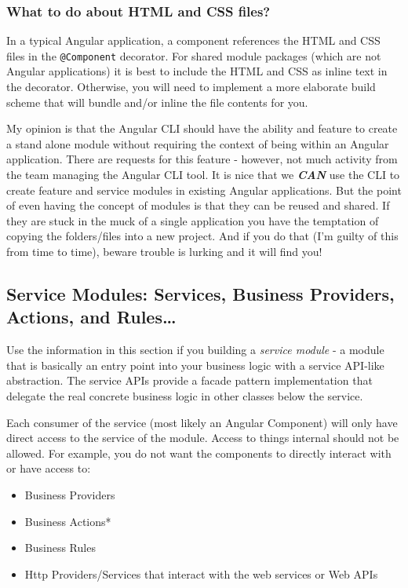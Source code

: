 \documentclass[]{book}
\providecommand{\tightlist}{%
  \setlength{\itemsep}{0pt}\setlength{\parskip}{0pt}}
\theoremstyle{definition}
\theoremstyle{definition}
\theoremstyle{definition}
\theoremstyle{remark}
\begin{document}
\subsubsection{What to do about HTML and CSS
files?}\label{what-to-do-about-html-and-css-files}

In a typical Angular application, a component references the HTML and
CSS files in the \texttt{@Component} decorator. For shared module
packages (which are not Angular applications) it is best to include the
HTML and CSS as inline text in the \citet{Component} decorator.
Otherwise, you will need to implement a more elaborate build scheme that
will bundle and/or inline the file contents for you.

My opinion is that the Angular CLI should have the ability and feature
to create a stand alone module without requiring the context of being
within an Angular application. There are requests for this feature -
however, not much activity from the team managing the Angular CLI tool.
It is nice that we \emph{\textbf{CAN}} use the CLI to create feature and
service modules in existing Angular applications. But the point of even
having the concept of modules is that they can be reused and shared. If
they are stuck in the muck of a single application you have the
temptation of copying the folders/files into a new project. And if you
do that (I'm guilty of this from time to time), beware trouble is
lurking and it will find you!

\hypertarget{service-modules}{\subsection{Service Modules: Services,
Business Providers, Actions, and Rules\ldots{}}\label{service-modules}}

Use the information in this section if you building a \emph{service
module} - a module that is basically an entry point into your business
logic with a service API-like abstraction. The service APIs provide a
facade pattern implementation that delegate the real concrete business
logic in other classes below the service.

Each consumer of the service (most likely an Angular Component) will
only have direct access to the service of the module. Access to things
internal should not be allowed. For example, you do not want the
components to directly interact with or have access to:

\begin{itemize}
\tightlist
\item
  Business Providers
\item
  Business Actions*
\item
  Business Rules
\item
  Http Providers/Services that interact with the web services or Web
  APIs
\end{itemize}
\end{document}
